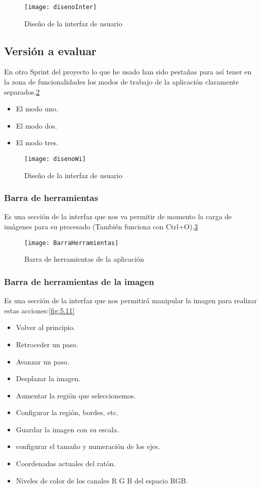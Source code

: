 \begin{figure}[h]
\centering
\texttt{[image: disenoInter]}
\caption{Diseño de la interfaz de usuario}
\label{fig:5.8}
\end{figure}

\subsection{Versión a evaluar}

En otro Sprint del proyecto lo que he usado han sido pestañas para así tener en la zona de funcionalidades los modos de trabajo de la aplicación claramente separados.\ref{fig:5.9}

\begin{itemize}
\item El modo uno.
\item El modo dos.
\item El modo tres.
\end{itemize}


\begin{figure}[h]
\centering
\texttt{[image: disenoWi]}
\caption{Diseño de la interfaz de usuario}
\label{fig:5.9}
\end{figure}
\subsubsection{Barra de herramientas}
Es una sección de la interfaz que nos va permitir de momento la carga de imágenes para su procesado (También funciona con Ctrl+O).\ref{fig:5.10}
\begin{figure}[h]
\centering
\texttt{[image: BarraHerramientas]}
\caption{Barra de herramientas de la aplicación}
\label{fig:5.10}
\end{figure}

\subsubsection{Barra de herramientas de la imagen}
Es una sección de la interfaz que nos permitirá manipular la imagen para realizar estas acciones:\ref{fig:5.11}

\begin{itemize}
\item Volver al principio. 
\item Retroceder un paso.
\item Avanzar un paso.
\item Desplazar la imagen.
\item Aumentar la región que seleccionemos.
\item Configurar la región, bordes, etc.
\item Guardar la imagen con su escala.
\item configurar el tamaño y numeración de los ejes.
\item Coordenadas actuales del ratón.
\item Niveles de color de los canales R G B del espacio RGB.
\end{itemize}

